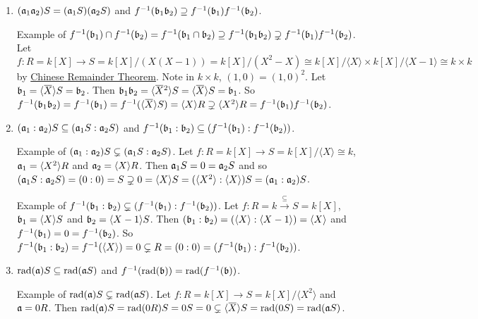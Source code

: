 \begin{proposition}
\begin{enumerate}
        \item\label{1.63e} $(\mathfrak{a}_1\mathfrak{a}_2)S = (\mathfrak{a}_1S)(\mathfrak{a}_2S)$ and $f^{-1}(\mathfrak{b}_1\mathfrak{b}_2) \supseteq f^{-1}(\mathfrak{b}_1)f^{-1}(\mathfrak{b}_2)$. \par
            Example of $f^{-1}(\mathfrak{b}_1) \cap f^{-1}(\mathfrak{b}_2) = f^{-1}(\mathfrak{b}_1 \cap \mathfrak{b}_2) \supseteq f^{-1}(\mathfrak{b}_1\mathfrak{b}_2) \supsetneq f^{-1}(\mathfrak{b}_1)f^{-1}(\mathfrak{b}_2)$. Let $f: R = k[X] \to S = k[X]/(X(X-1)) = k[X]/(X^2-X) \cong k[X]/\langle X \rangle \times k[X]/\langle X-1 \rangle \cong k \times k$ by \hyperref[1.46]{Chinese Remainder Theorem}. Note in $k \times k$, $(1,0) = (1,0)^2$. Let $\ffb_1 = \langle \overbar X \rangle S = \ffb_2$. Then $\ffb_1 \ffb_2 = \langle \overbar X^2 \rangle S = \langle \overbar X \rangle S = \ffb_1$. So $f^{-1}(\ffb_1 \ffb_2) = f^{-1}(\ffb_1)  =  f^{-1}(\langle \overbar X \rangle S) = \langle X \rangle R \supsetneq \langle X^2 \rangle R = f^{-1}(\ffb_1)f^{-1}(\ffb_2)$.
        \item\label{1.63f} $(\mathfrak{a}_1:\mathfrak{a}_2)S \subseteq (\mathfrak{a}_1S:\mathfrak{a}_2S)$ and $f^{-1}(\mathfrak{b}_1:\mathfrak{b}_2) \subseteq (f^{-1}(\mathfrak{b}_1):f^{-1}(\mathfrak{b}_2))$. \par
            Example of $(\mathfrak{a}_1:\mathfrak{a}_2)S \subsetneq (\mathfrak{a}_1S : \mathfrak{a}_2 S)$. Let $f: R = k[X] \to S = k[X]/\langle X \rangle \cong k$, $\mathfrak{a}_1 = \langle X^2 \rangle R$ and $\mathfrak{a}_2 = \langle X \rangle R$. Then $\mathfrak{a}_1 S = 0 = \mathfrak{a}_2 S$ and so $(\mathfrak{a}_1 S: \mathfrak{a}_2 S) = (0:0) = S \supsetneq 0 = \langle X \rangle S = (\langle X^2 \rangle: \langle X \rangle)S = (\mathfrak{a}_1:\mathfrak{a}_2)S$. \par
            Example of $f^{-1}(\mathfrak{b}_1:\mathfrak{b}_2) \subsetneq (f^{-1}(\mathfrak{b}_1):f^{-1}(\mathfrak{b}_2))$. Let $f: R = k \xrightarrow {\subseteq} S = k[X]$, $\mathfrak{b}_1 = \langle X \rangle S$ and $\mathfrak{b}_2 = \langle X-1 \rangle S$. Then $(\mathfrak{b}_1:\mathfrak{b}_2) = (\langle X \rangle: \langle X-1 \rangle) = \langle X \rangle$ and $f^{-1}(\mathfrak{b}_1) = 0 = f^{-1}(\mathfrak{b}_2)$. So $f^{-1}(\mathfrak{b}_1:\mathfrak{b}_2) = f^{-1}(\langle X \rangle) = 0 \subsetneq R = (0:0) = (f^{-1}(\mathfrak{b}_1):f^{-1}(\mathfrak{b}_2))$. 
        \item\label{1.63g} $\operatorname{rad}(\mathfrak{a})S \subseteq \operatorname{rad}(\mathfrak{a} S)$ and $f^{-1}(\operatorname{rad}(\mathfrak{b})) = \operatorname{rad}(f^{-1}(\mathfrak{b}))$. \par
            Example of $\operatorname{rad}(\mathfrak{a}) S \subsetneq \operatorname{rad}(\mathfrak{a} S)$. Let $f: R = k[X] \to S = k[X]/\langle X^2 \rangle$ and $\mathfrak{a} = 0R$. Then $\operatorname{rad}(\ffa)S = \operatorname{rad}(0R)S = 0S = 0 \subsetneq \langle \overbar X \rangle S = \operatorname{rad}(0S) = \operatorname{rad}(\ffa S)$.
    \end{enumerate}
\end{proposition}

